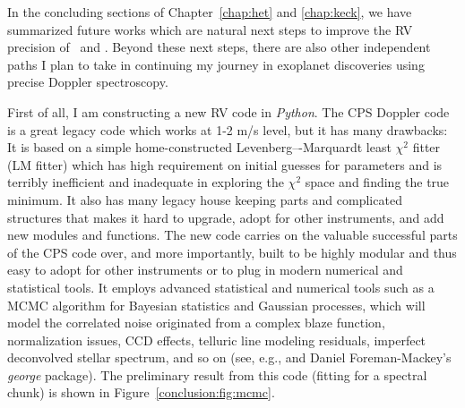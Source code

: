 In the concluding sections of Chapter~\ref{chap:het} and
\ref{chap:keck}, we have summarized future works which are natural
next steps to improve the RV precision of \het\ and \keck. Beyond
these next steps, there are also other independent paths I plan to
take in continuing my journey in exoplanet discoveries using precise
Doppler spectroscopy.

First of all, I am constructing a new RV code in {\it Python}. The CPS
Doppler code is a great legacy code which works at 1-2 m/s level, but
it has many drawbacks: It is based on a simple home-constructed
Levenberg–-Marquardt least $\chi^2$ fitter (LM fitter) which has high
requirement on initial guesses for parameters and is terribly
inefficient and inadequate in exploring the $\chi^2$ space and finding
the true minimum. It also has many legacy house keeping parts and
complicated structures that makes it hard to upgrade, adopt for other
instruments, and add new modules and functions. The new code carries
on the valuable successful parts of the CPS code over, and more
importantly, built to be highly modular and thus easy to adopt for
other instruments or to plug in modern numerical and statistical
tools. It employs advanced statistical and numerical tools such as a
MCMC algorithm for Bayesian statistics and Gaussian processes, which
will model the correlated noise originated from a complex blaze
function, normalization issues, CCD effects, telluric line modeling
residuals, imperfect deconvolved stellar spectrum, and so on (see,
e.g., \citealt{starfish} and Daniel Foreman-Mackey's {\it george}
package). The preliminary result from this code (fitting for a
spectral chunk) is shown in Figure~\ref{conclusion:fig:mcmc}.


